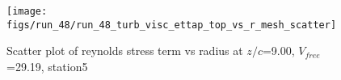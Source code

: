 \begin{figure}[H]
\centering
\texttt{[image: figs/run\_48/run\_48\_turb\_visc\_ettap\_top\_vs\_r\_mesh\_scatter]}
\caption{Scatter plot of reynolds stress term vs radius at $z/c$=9.00, $V_{free}$=29.19, station5}
\label{fig:run_48_turb_visc_ettap_top_vs_r_mesh_scatter}
\end{figure}



